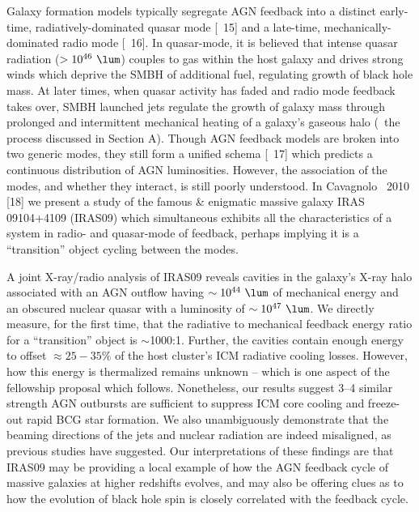 \documentclass[letterpaper,12pt]{article}
\begin{document}
 Galaxy formation
models typically segregate AGN feedback into a distinct early-time,
radiatively-dominated quasar mode [\eg\ 15] and a late-time,
mechanically-dominated radio mode [\eg\ 16]. In quasar-mode, it is
believed that intense quasar radiation ($> 10^{46} ~\lum$) couples to
gas within the host galaxy and drives strong winds which deprive the
SMBH of additional fuel, regulating growth of black hole mass. At
later times, when quasar activity has faded and radio mode feedback
takes over, SMBH launched jets regulate the growth of galaxy mass
through prolonged and intermittent mechanical heating of a galaxy's
gaseous halo (\ie\ the process discussed in Section A). Though AGN
feedback models are broken into two generic modes, they still form a
unified schema [\eg\ 17] which predicts a continuous distribution of
AGN luminosities. However, the association of the modes, and whether
they interact, is still poorly understood. In Cavagnolo \etal\ 2010
[18] we present a study of the famous \& enigmatic massive galaxy IRAS
09104+4109 (IRAS09) which simultaneous exhibits all the
characteristics of a system in radio- and quasar-mode of feedback,
perhaps implying it is a ``transition'' object cycling between the
modes.

A joint X-ray/radio analysis of IRAS09 reveals cavities in the
galaxy's X-ray halo associated with an AGN outflow having $\sim
10^{44} ~\lum$ of mechanical energy and an obscured nuclear quasar
with a luminosity of $\sim 10^{47} ~\lum$. We directly measure, for
the first time, that the radiative to mechanical feedback energy ratio
for a ``transition'' object is $\sim$1000:1. Further, the cavities
contain enough energy to offset $\approx 25-35\%$ of the host
cluster's ICM radiative cooling losses. However, how this energy is
thermalized remains unknown -- which is one aspect of the fellowship
proposal which follows. Nonetheless, our results suggest 3--4 similar
strength AGN outbursts are sufficient to suppress ICM core cooling and
freeze-out rapid BCG star formation. We also unambiguously demonstrate
that the beaming directions of the jets and nuclear radiation are
indeed misaligned, as previous studies have suggested. Our
interpretations of these findings are that IRAS09 may be providing a
local example of how the AGN feedback cycle of massive galaxies at
higher redshifts evolves, and may also be offering clues as to how the
evolution of black hole spin is closely correlated with the feedback
cycle.
\end{document}
